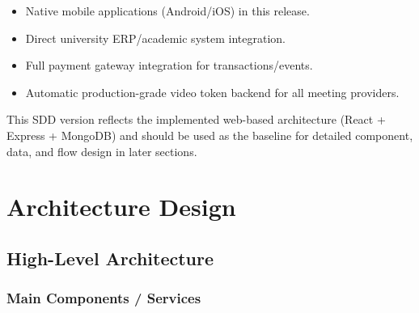 \documentclass[12pt,a4paper]{article}
\begin{document}
\begin{itemize}[noitemsep]
  \item Native mobile applications (Android/iOS) in this release.
  \item Direct university ERP/academic system integration.
  \item Full payment gateway integration for transactions/events.
  \item Automatic production-grade video token backend for all meeting providers.
\end{itemize}

\begin{tcolorbox}[significancestyle]
This SDD version reflects the implemented web-based architecture (React + Express + MongoDB)
and should be used as the baseline for detailed component, data, and flow design in later sections.
\end{tcolorbox}

\section{Architecture Design}

\subsection{High-Level Architecture}

\subsubsection{Main Components / Services}
\end{document}

